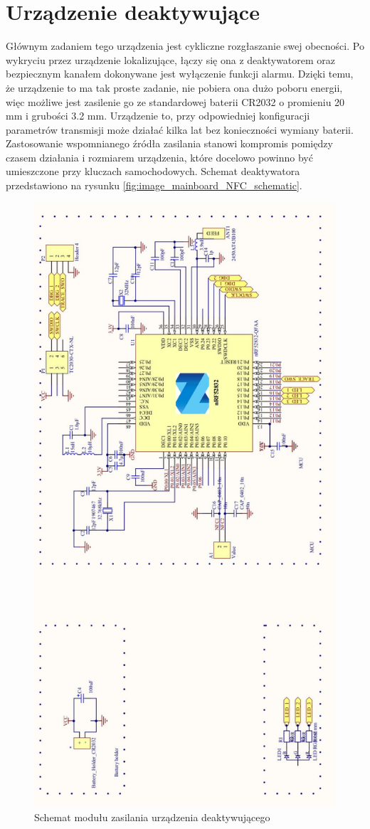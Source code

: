 \clearpage
\section{Urządzenie deaktywujące}

Głównym zadaniem tego urządzenia jest cykliczne rozgłaszanie swej obecności. Po wykryciu przez urządzenie lokalizujące, łączy się ona z deaktywatorem oraz bezpiecznym kanałem dokonywane jest wyłączenie funkcji alarmu. Dzięki temu, że urządzenie to ma tak proste zadanie, nie pobiera ona dużo poboru energii, więc możliwe jest zasilenie go ze standardowej baterii CR2032 o promieniu 20 mm i grubości 3.2 mm. Urządzenie to, przy odpowiedniej konfiguracji parametrów transmisji może działać kilka lat bez konieczności wymiany baterii. Zastosowanie wspomnianego źródła zasilania stanowi kompromis pomiędzy czasem działania i rozmiarem urządzenia, które docelowo powinno być umieszczone przy kluczach samochodowych. Schemat deaktywatora przedstawiono na rysunku \ref{fig:image_mainboard_NFC_schematic}.

\begin{figure}[h]
	\centering
	\includegraphics[width=12cm]{img/schematics/keytag.jpg}
	\caption{Schemat modułu zasilania urządzenia deaktywującego}
	\label{fig:image_keytag_schematic}
\end{figure}
